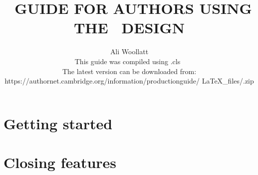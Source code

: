 \begin{smallverbatim}
% 

  

  \title[Subtitle, If You Have One]
    {\LaTeXe\ GUIDE FOR AUTHORS USING THE \cambridge\ DESIGN}

  \author{Ali Woollatt\\[3\baselineskip]
    This guide was compiled using \hbox{\cambridge.cls \version}\\[\baselineskip]
    The latest version can be downloaded from:
    https://authornet.cambridge.org/information/productionguide/
      LaTeX\_files/\cambridge.zip}

  \frontmatter
  \maketitle
  \tableofcontents
  \listoffigures
  \listoftables
  \listofcontributors

  \mainmatter
  \part{Getting started}

  \part{Closing features}

  \backmatter
  \appendix
  
  
  
  \endappendix

  \theendnotes

  \label{refs}
  

  \cleardoublepage






\end{smallverbatim}

\endinput